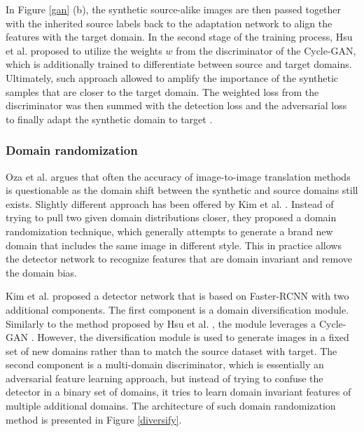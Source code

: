 \documentclass[english, 12pt, a4paper, elec, utf8, a-1b, online]{aaltothesis}
\begin{document}
In Figure \ref{gan} (b), the synthetic source-alike images are then passed together with the inherited source labels back to the adaptation network to align the features with the target domain. In the second stage of the training process, Hsu et al. proposed to utilize the weights $w$ from the discriminator of the Cycle-GAN, which is additionally trained to differentiate between source and target domains. Ultimately, such approach allowed to amplify the importance of the synthetic samples that are closer to the target domain. The weighted loss from the discriminator was then summed with the detection loss and the adversarial loss to finally adapt the synthetic domain to target \cite{Hsu2019}. 

\subsubsection{Domain randomization}

Oza et al. \cite{Oza2021} argues that often the accuracy of image-to-image translation methods is questionable as the domain shift between the synthetic and source domains still exists. Slightly different approach has been offered by Kim et al. \cite{Kim2019}. Instead of trying to pull two given domain distributions closer, they proposed a domain randomization technique, which generally attempts to generate a brand new domain that includes the same image in different style. This in practice allows the detector network to recognize features that are domain invariant and remove the domain bias. 

Kim et al. proposed a detector network that is based on Faster-RCNN with two additional components. The first component is a domain diversification module. Similarly to the method proposed by Hsu et al. \cite{Hsu2019}, the module leverages a Cycle-GAN \cite{Zhu2017}. However, the diversification module is used to generate images in a fixed set of new domains rather than to match the source dataset with target.  The second component is a multi-domain discriminator, which is essentially an adversarial feature learning approach, but instead of trying to confuse the detector in a binary set of domains, it tries to learn domain invariant features of multiple additional domains. The architecture of such domain randomization method is presented in Figure \ref{diversify}.
\end{document}

